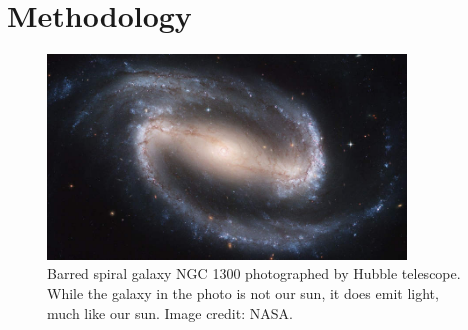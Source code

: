 
\chapter{Methodology}
\begin{refsection}

\begin{figure}[ht]
    \centering
	\includegraphics[width=0.85\textwidth]{figures/sampleFig1.jpg} 
	\caption[Barred spiral galaxy NGC 1300]{Barred spiral galaxy NGC 1300 photographed by Hubble telescope. While the galaxy in the photo is not our sun, it does emit light, much like our sun. Image credit: NASA.}
	\label{fig:firstFig}
\end{figure}

\clearpage

\printbibliography[heading=subbibintoc, title={\texorpdfstring{\centering}{} Notes}]
\end{refsection}